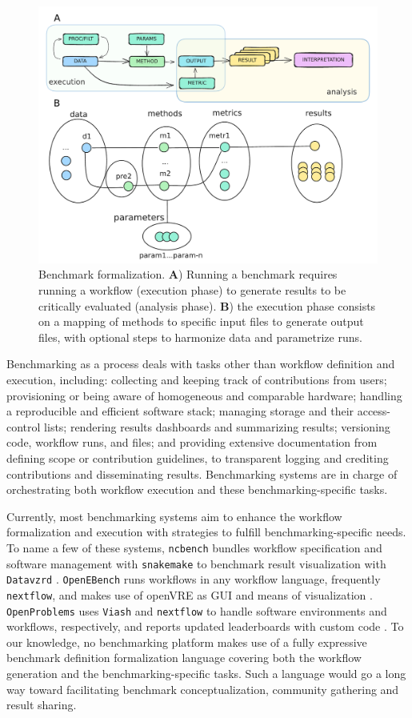 \documentclass[11pt]{article}
\begin{document}
\begin{figure}
    \centering
    \includegraphics[width=0.7\linewidth]{figures/bens_formalization.pdf}
    \caption[Benchmark formalization.]{Benchmark formalization. \textbf{A}) Running a benchmark requires running a workflow (execution phase) to generate results to be critically evaluated (analysis phase). \textbf{B}) the execution phase consists on a mapping of methods to specific input files to generate output files, with optional steps to harmonize data and parametrize runs.}
    \label{fig:formalization}
\end{figure}

Benchmarking as a process deals with tasks other than workflow definition and execution, including: collecting and keeping track of contributions from users; provisioning or being aware of homogeneous and comparable hardware; handling a reproducible and efficient software stack; managing storage and their access-control lists; rendering results dashboards and summarizing results; versioning code, workflow runs, and files; and providing extensive documentation from defining scope or contribution guidelines, to transparent logging and crediting contributions and disseminating results. Benchmarking systems are in charge of orchestrating both workflow execution and these benchmarking-specific tasks.

Currently, most benchmarking systems aim to enhance the workflow formalization and execution with strategies to fulfill benchmarking-specific needs. To name a few of these systems, \texttt{ncbench} bundles workflow specification and software management with \texttt{snakemake} to benchmark result visualization with \texttt{Datavzrd} \cite{Hanssen2023-uf}. \texttt{OpenEBench} runs workflows in any workflow language, frequently \texttt{nextflow}, and makes use of openVRE as GUI and means of visualization \cite{Capella-Gutierrez2017-dh}. \texttt{OpenProblems} uses \texttt{Viash} and \texttt{nextflow} to handle software environments and workflows, respectively, and reports updated leaderboards with custom code \cite{Luecken2024-fk}. To our knowledge, no benchmarking platform makes use of a fully expressive benchmark definition formalization language covering both the workflow generation and the benchmarking-specific tasks. Such a language would go a long way toward facilitating benchmark conceptualization, community gathering and result sharing.
\end{document}
